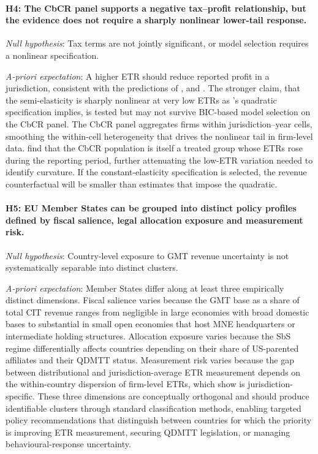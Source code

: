 \documentclass[11pt,a4paper]{article}
\begin{document}
\paragraph{H4: The CbCR panel supports a negative tax--profit relationship, but the evidence does not require a sharply nonlinear lower-tail response.}

\noindent\textit{Null hypothesis}: Tax terms are not jointly significant, or model selection requires a nonlinear specification.

\noindent\textit{A-priori expectation}: A higher ETR should reduce reported profit in a jurisdiction, consistent with the predictions of \citet{heckemeyer2017}, \citet{dowd2017} and \citet{garcia-bernardo2024}. The stronger claim, that the semi-elasticity is sharply nonlinear at very low ETRs as \citeauthor{dowd2017}'s quadratic specification implies, is tested but may not survive BIC-based model selection on the CbCR panel. The CbCR panel aggregates firms within jurisdiction--year cells, smoothing the within-cell heterogeneity that drives the nonlinear tail in firm-level data. \citet{tuinsma2025} find that the CbCR population is itself a treated group whose ETRs rose during the reporting period, further attenuating the low-ETR variation needed to identify curvature. If the constant-elasticity specification is selected, the revenue counterfactual will be smaller than estimates that impose the \citeauthor{dowd2017} quadratic.

\paragraph{H5: EU Member States can be grouped into distinct policy profiles defined by fiscal salience, legal allocation exposure and measurement risk.}

\noindent\textit{Null hypothesis}: Country-level exposure to GMT revenue uncertainty is not systematically separable into distinct clusters.

\noindent\textit{A-priori expectation}: Member States differ along at least three empirically distinct dimensions. Fiscal salience varies because the GMT base as a share of total CIT revenue ranges from negligible in large economies with broad domestic bases to substantial in small open economies that host MNE headquarters or intermediate holding structures. Allocation exposure varies because the SbS regime differentially affects countries depending on their share of US-parented affiliates and their QDMTT status. Measurement risk varies because the gap between distributional and jurisdiction-average ETR measurement depends on the within-country dispersion of firm-level ETRs, which \citet{hugger2026} show is jurisdiction-specific. These three dimensions are conceptually orthogonal and should produce identifiable clusters through standard classification methods, enabling targeted policy recommendations that distinguish between countries for which the priority is improving ETR measurement, securing QDMTT legislation, or managing behavioural-response uncertainty.
\end{document}

